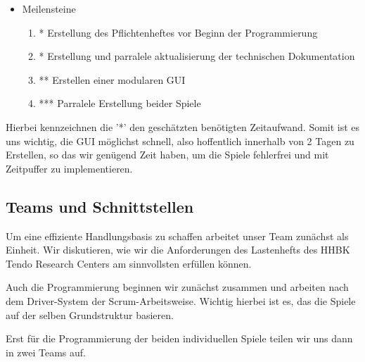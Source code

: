 \documentclass[14pt]{scrartcl}
\begin{document}
\begin{itemize}
    \item Meilensteine
    \begin{enumerate}
    \item * Erstellung des Pflichtenheftes vor Beginn der Programmierung 
    \item * Erstellung und parralele aktualisierung der technischen Dokumentation 
    \item ** Erstellen einer modularen GUI 
    \item *** Parralele Erstellung beider Spiele 
    \end{enumerate}
\end{itemize}

Hierbei kennzeichnen die '*' den geschätzten benötigten Zeitaufwand. Somit ist es uns wichtig, die GUI möglichst schnell, also hoffentlich innerhalb von 2 Tagen zu Erstellen, so das wir genügend Zeit haben, um die Spiele fehlerfrei und mit Zeitpuffer zu implementieren. \par

\subsection{Teams und Schnittstellen}

Um eine effiziente Handlungsbasis zu schaffen arbeitet unser Team zunächst als Einheit. Wir diskutieren, wie wir die Anforderungen des Lastenhefts des HHBK Tendo Research Centers am sinnvollsten erfüllen können. \par 

Auch die Programmierung beginnen wir zunächst zusammen und arbeiten nach dem Driver-System der Scrum-Arbeitsweise. 
Wichtig hierbei ist es, das die Spiele auf der selben Grundstruktur basieren. \par

Erst für die Programmierung der beiden individuellen Spiele teilen wir uns dann in zwei Teams auf. \par 

\end{document}
